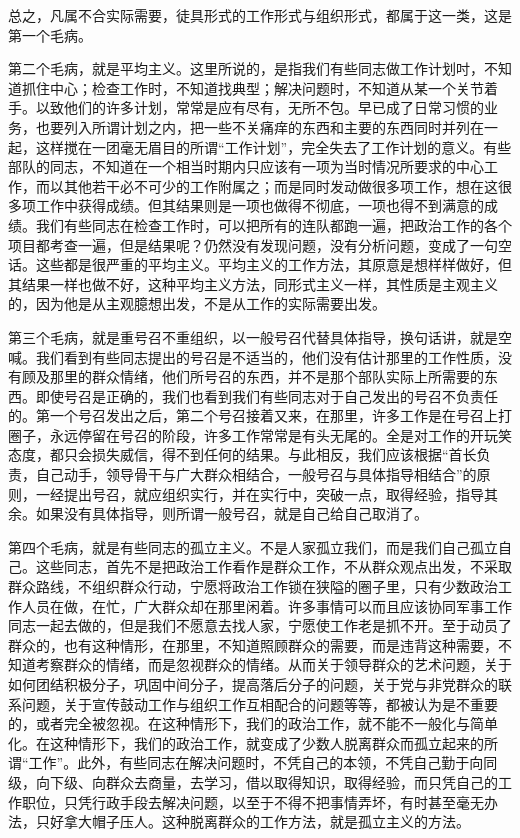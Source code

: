 总之，凡属不合实际需要，徒具形式的工作形式与组织形式，都属于这一类，这是第一个毛病。

第二个毛病，就是平均主义。这里所说的，是指我们有些同志做工作计划吋，不知道抓住中心；检查工作时，不知道找典型；解决问题时，不知道从某一个关节着手。以致他们的许多计划，常常是应有尽有，无所不包。早已成了日常习惯的业务，也要列入所谓计划之内，把一些不关痛痒的东西和主要的东西同时并列在一起，这样搅在一团毫无眉目的所谓“工作计划”，完全失去了工作计划的意义。有些部队的同志，不知道在一个相当时期内只应该有一项为当时情况所要求的中心工作，而以其他若干必不可少的工作附属之；而是同时发动做很多项工作，想在这很多项工作中获得成绩。但其结果则是一项也做得不彻底，一项也得不到满意的成绩。我们有些同志在检查工作时，可以把所有的连队都跑一遍，把政治工作的各个项目都考查一遍，但是结果呢？仍然没有发现问题，没有分析问题，变成了一句空话。这些都是很严重的平均主义。平均主义的工作方法，其原意是想样样做好，但其结果一样也做不好，这种平均主义方法，同形式主义一样，其性质是主观主义的，因为他是从主观臆想出发，不是从工作的实际需要出发。

第三个毛病，就是重号召不重组织，以一般号召代替具体指导，换句话讲，就是空喊。我们看到有些同志提出的号召是不适当的，他们没有估计那里的工作性质，没有顾及那里的群众情绪，他们所号召的东西，并不是那个部队实际上所需要的东西。即使号召是正确的，我们也看到我们有些同志对于自己发出的号召不负责任的。第一个号召发出之后，第二个号召接着又来，在那里，许多工作是在号召上打圈子，永远停留在号召的阶段，许多工作常常是有头无尾的。全是对工作的开玩笑态度，都只会损失威信，得不到任何的结果。与此相反，我们应该根据“首长负责，自己动手，领导骨干与广大群众相结合，一般号召与具体指导相结合”的原则，一经提出号召，就应组织实行，并在实行中，突破一点，取得经验，指导其余。如果没有具体指导，则所谓一般号召，就是自己给自己取消了。

第四个毛病，就是有些同志的孤立主义。不是人家孤立我们，而是我们自己孤立自己。这些同志，首先不是把政治工作看作是群众工作，不从群众观点出发，不采取群众路线，不组织群众行动，宁愿将政治工作锁在狭隘的圈子里，只有少数政治工作人员在做，在忙，广大群众却在那里闲着。许多事情可以而且应该协同军事工作同志一起去做的，但是我们不愿意去找人家，宁愿使工作老是抓不开。至于动员了群众的，也有这种情形，在那里，不知道照顾群众的需要，而是违背这种需要，不知道考察群众的情绪，而是忽视群众的情绪。从而关于领导群众的艺术问题，关于如何团结积极分子，巩固中间分子，提高落后分子的问题，关于党与非党群众的联系问题，关于宣传鼓动工作与组织工作互相配合的问题等等，都被认为是不重要的，或者完全被忽视。在这种情形下，我们的政治工作，就不能不一般化与简单化。在这种情形下，我们的政治工作，就变成了少数人脱离群众而孤立起来的所谓“工作”。此外，有些同志在解决问题时，不凭自己的本领，不凭自己勤于向同级，向下级、向群众去商量，去学习，借以取得知识，取得经验，而只凭自己的工作职位，只凭行政手段去解决问题，以至于不得不把事情弄坏，有时甚至毫无办法，只好拿大帽子压人。这种脱离群众的工作方法，就是孤立主义的方法。


